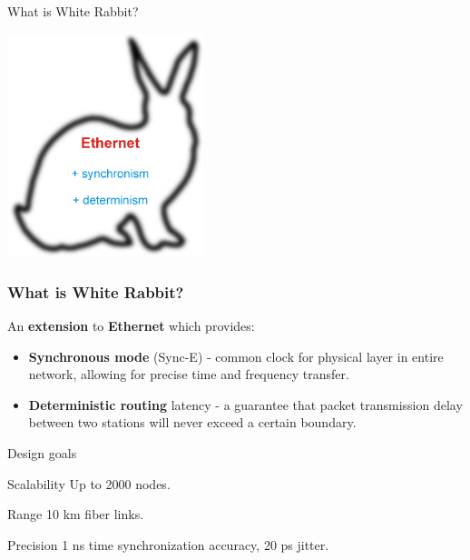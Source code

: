 \documentclass[xcolor=dvipsnames]{beamer}
\begin{document}
\begin{frame}{What is White Rabbit?}
\begin{center}
\includegraphics[height=6.5cm]{../../figures/misc/rabbit.pdf}
\end{center}
\end{frame}

\frame
{
  \frametitle{What is White Rabbit?}

\begin{block}{}
  An \textbf{extension} to \textbf{Ethernet} which provides:
  \begin{itemize}
  \item \textbf{Synchronous mode} (Sync-E) - common clock for physical layer in entire network, allowing for precise time and frequency transfer.

\item \textbf{Deterministic routing} latency - a guarantee that packet transmission delay between two stations will never exceed a certain boundary.
\end{itemize}
\end{block}

}

\begin{frame}{Design goals}
\begin{block}{Scalability}
Up to 2000 nodes.
\end{block}

\begin{block}{Range}
10 km fiber links.
\end{block}

\begin{block}{Precision}
1 ns time synchronization accuracy, 20 ps jitter.
\end{block}

\end{frame}
\end{document}

